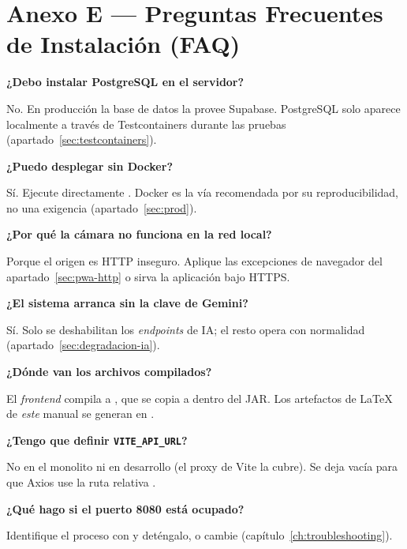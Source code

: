 \section{Anexo E — Preguntas Frecuentes de Instalación (FAQ)}%
\label{sec:anexo-faq}

\textbf{¿Debo instalar PostgreSQL en el servidor?}\par
No. En producción la base de datos la provee Supabase. PostgreSQL solo aparece localmente a
través de Testcontainers durante las pruebas (apartado~\ref{sec:testcontainers}).\par

\textbf{¿Puedo desplegar sin Docker?}\par
Sí. Ejecute directamente  
. Docker es la vía recomendada por su reproducibilidad, no
una exigencia (apartado~\ref{sec:prod}).\par

\textbf{¿Por qué la cámara no funciona en la red local?}\par
Porque el origen es HTTP inseguro. Aplique las excepciones de navegador del
apartado~\ref{sec:pwa-http} o sirva la aplicación bajo HTTPS.\par

\textbf{¿El sistema arranca sin la clave de Gemini?}\par
Sí. Solo se deshabilitan los \textit{endpoints} de IA; el resto opera con normalidad
(apartado~\ref{sec:degradacion-ia}).\par

\textbf{¿Dónde van los archivos compilados?}\par
El \textit{frontend} compila a , que se copia a  dentro del
JAR. Los artefactos de LaTeX de \emph{este} manual se generan en .\par

\textbf{¿Tengo que definir \texttt{VITE\_API\_URL}?}\par
No en el monolito ni en desarrollo (el proxy de Vite la cubre). Se deja vacía para que
Axios use la ruta relativa .\par

\textbf{¿Qué hago si el puerto 8080 está ocupado?}\par
Identifique el proceso con  y deténgalo, o cambie
 (capítulo~\ref{ch:troubleshooting}).\par


